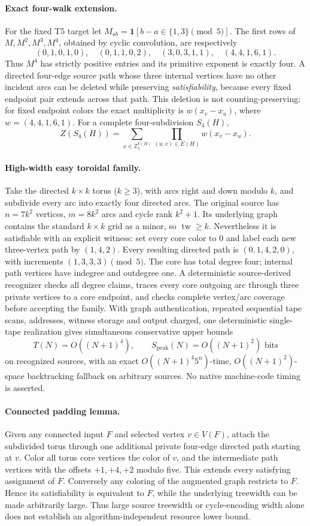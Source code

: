 \documentclass[11pt]{article}
\begin{document}
\paragraph{Exact four-walk extension.}
For the fixed T5 target let $M_{ab}=\mathbf 1[b-a\in\{1,3\}\pmod5]$.
The first rows of $M,M^2,M^3,M^4$, obtained by cyclic convolution,
are respectively
\[
(0,1,0,1,0),\quad(0,1,1,0,2),\quad
(3,0,3,1,1),\quad(4,4,1,6,1).
\]
Thus $M^4$ has strictly positive entries and its primitive exponent
is exactly four. A directed four-edge source path whose three internal
vertices have no other incident arcs can be deleted while preserving
\emph{satisfiability}, because every fixed endpoint pair extends across
that path. This deletion is not counting-preserving: for fixed endpoint
colors the exact multiplicity is $w(x_v-x_u)$, where
$w=(4,4,1,6,1)$. For a complete four-subdivision $S_4(H)$,
\[
Z(S_4(H))=\sum_{x\in\mathbb Z_5^{V(H)}}
\prod_{(u,v)\in E(H)}w(x_v-x_u).
\]
\paragraph{High-width easy toroidal family.}
Take the directed $k\times k$ torus ($k\ge3$), with arcs right and down
modulo $k$, and subdivide every arc into exactly four directed arcs.
The original source has $n=7k^2$ vertices, $m=8k^2$ arcs and
cycle rank $k^2+1$. Its underlying graph contains the standard
$k\times k$ grid as a minor, so $\operatorname{tw}\ge k$.
Nevertheless it is satisfiable with an explicit witness: set every
core color to $0$ and label each new three-vertex path by $(1,4,2)$.
Every resulting directed path is
$(0,1,4,2,0)$, with increments $(1,3,3,3)\pmod5$.
The core has total degree four; internal path vertices have
indegree and outdegree one. A deterministic source-derived recognizer
checks all degree claims, traces every core outgoing arc through
three private vertices to a core endpoint, and checks complete
vertex/arc coverage before accepting the family. With graph
authentication, repeated sequential tape scans, addresses, witness
storage and output charged, one deterministic single-tape realization
gives simultaneous conservative upper bounds
\[
T(N)=O((N+1)^4),\qquad
S_{\mathrm{peak}}(N)=O((N+1)^2)\text{ bits}
\]
on recognized sources, with an exact $O((N+1)^4 5^n)$-time,
$O((N+1)^2)$-space backtracking fallback on arbitrary sources.
No native machine-code timing is asserted.
\paragraph{Connected padding lemma.}
Given any connected input $F$ and selected vertex $v\in V(F)$,
attach the subdivided torus through one additional private four-edge
directed path starting at $v$. Color all torus core vertices the
color of $v$, and the intermediate path vertices with the offsets
$+1,+4,+2$ modulo five. This extends every satisfying assignment of
$F$. Conversely any coloring of the augmented graph restricts to
$F$. Hence its satisfiability is equivalent to $F$, while the
underlying treewidth can be made arbitrarily large. Thus large
source treewidth or cycle-encoding width alone does not establish
an algorithm-independent resource lower bound.
\end{document}
